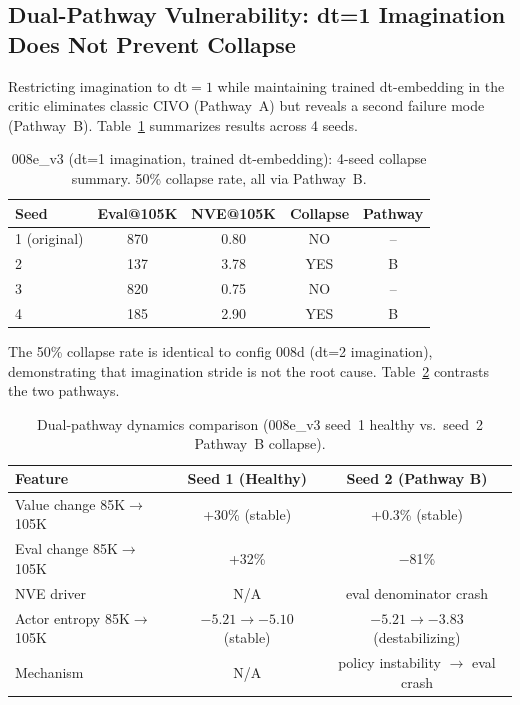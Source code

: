 \documentclass[10pt,letterpaper]{article}
\begin{document}
\subsection{Dual-Pathway Vulnerability: dt=1 Imagination Does Not Prevent Collapse}
\label{sec:dual_pathway}

Restricting imagination to $\mathrm{dt}=1$ while maintaining trained dt-embedding in the critic eliminates classic CIVO (Pathway~A) but reveals a second failure mode (Pathway~B).
Table~\ref{tab:008e_v3_allseeds} summarizes results across 4 seeds.

\begin{table}[h]
\centering
\caption{008e\_v3 (dt=1 imagination, trained dt-embedding): 4-seed collapse summary. 50\% collapse rate, all via Pathway~B.}
\label{tab:008e_v3_allseeds}
\begin{tabular}{lcccc}
\toprule
Seed & Eval@105K & NVE@105K & Collapse & Pathway \\
\midrule
1 (original) & 870 & 0.80 & NO & -- \\
2 & 137 & 3.78 & YES & B \\
3 & 820 & 0.75 & NO & -- \\
4 & 185 & 2.90 & YES & B \\
\bottomrule
\end{tabular}
\end{table}

The 50\% collapse rate is identical to config 008d (dt=2 imagination), demonstrating that imagination stride is not the root cause.
Table~\ref{tab:dual_pathway_dynamics} contrasts the two pathways.

\begin{table}[h]
\centering
\caption{Dual-pathway dynamics comparison (008e\_v3 seed~1 healthy vs.\ seed~2 Pathway~B collapse).}
\label{tab:dual_pathway_dynamics}
\begin{tabular}{lcc}
\toprule
Feature & Seed 1 (Healthy) & Seed 2 (Pathway B) \\
\midrule
Value change 85K$\to$105K & +30\% (stable) & +0.3\% (stable) \\
Eval change 85K$\to$105K & +32\% & $-$81\% \\
NVE driver & N/A & eval denominator crash \\
Actor entropy 85K$\to$105K & $-5.21 \to -5.10$ (stable) & $-5.21 \to -3.83$ (destabilizing) \\
Mechanism & N/A & policy instability $\to$ eval crash \\
\bottomrule
\end{tabular}
\end{table}
\end{document}
